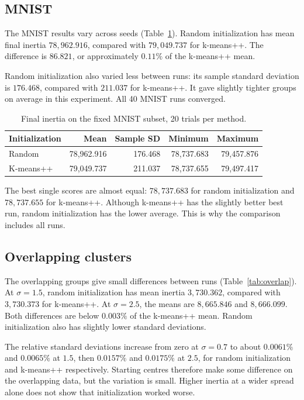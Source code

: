 \documentclass[11pt,a4paper]{article}
\begin{document}
\subsection{MNIST}

The MNIST results vary across seeds (Table~\ref{tab:mnist}). Random initialization has mean final inertia $78{,}962.916$, compared with $79{,}049.737$ for k-means++. The difference is $86.821$, or approximately $0.11\%$ of the k-means++ mean.

Random initialization also varied less between runs: its sample standard deviation is $176.468$, compared with $211.037$ for k-means++. It gave slightly tighter groups on average in this experiment. All 40 MNIST runs converged.

\begin{table}[htbp]
\centering
\caption{Final inertia on the fixed MNIST subset, 20 trials per method.}
\label{tab:mnist}
\small
\begin{tabular}{@{}lrrrr@{}}
\toprule
Initialization & Mean & Sample SD & Minimum & Maximum\\
\midrule
Random & 78,962.916 & 176.468 & 78,737.683 & 79,457.876\\
K-means++ & 79,049.737 & 211.037 & 78,737.655 & 79,497.417\\
\bottomrule
\end{tabular}
\end{table}

The best single scores are almost equal: $78{,}737.683$ for random initialization and $78{,}737.655$ for k-means++. Although k-means++ has the slightly better best run, random initialization has the lower average. This is why the comparison includes all runs.

\subsection{Overlapping clusters}

The overlapping groups give small differences between runs (Table~\ref{tab:overlap}). At $\sigma=1.5$, random initialization has mean inertia $3{,}730.362$, compared with $3{,}730.373$ for k-means++. At $\sigma=2.5$, the means are $8{,}665.846$ and $8{,}666.099$. Both differences are below $0.003\%$ of the k-means++ mean. Random initialization also has slightly lower standard deviations.

The relative standard deviations increase from zero at $\sigma=0.7$ to about $0.0061\%$ and $0.0065\%$ at $1.5$, then $0.0157\%$ and $0.0175\%$ at $2.5$, for random initialization and k-means++ respectively. Starting centres therefore make some difference on the overlapping data, but the variation is small. Higher inertia at a wider spread alone does not show that initialization worked worse.
\end{document}
